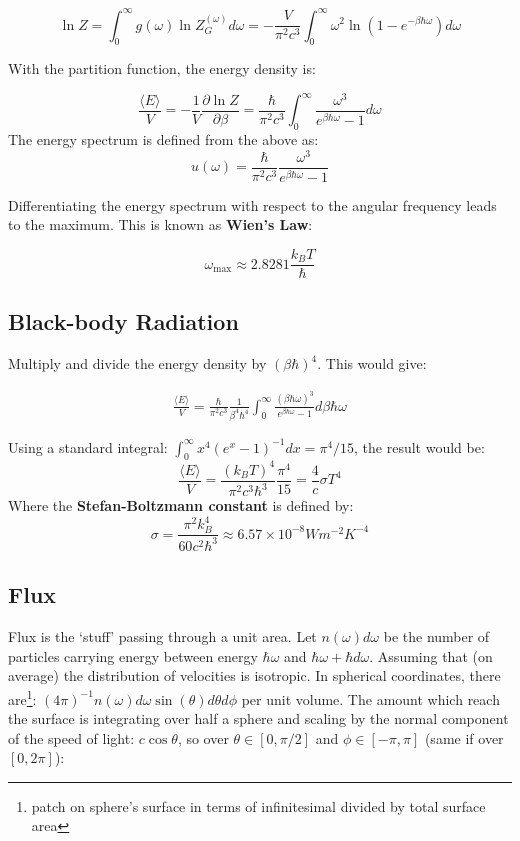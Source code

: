\documentclass[12pt]{article}
\begin{document}
\[\boxed{\ln Z = \int^\infty_0 g(\omega) \ln Z_G^{(\omega)} d\omega = -\frac{V}{\pi^2c^3}\int^\infty_0 \omega^2 \ln \left(1 - e^{-\beta \hbar \omega}\right) d\omega}\]

With the partition function, the energy density is:

\[\boxed{\frac{\langle E \rangle}{V} = -\frac{1}{V}\frac{\partial \ln Z}{\partial \beta}= \frac{\hbar}{\pi^2 c^3} \int^\infty_0 \frac{\omega^3}{e^{\beta\hbar\omega} - 1} d\omega}\]
The energy spectrum is defined from the above as:
\[\boxed{u(\omega) = \frac{\hbar}{\pi^2 c^3}  \frac{\omega^3}{e^{\beta\hbar\omega} - 1}}\]

Differentiating the energy spectrum with respect to the angular frequency leads to the maximum. This is known as \textbf{Wien's Law}:

\[\boxed{\omega_\text{max}\approx 2.8281\frac{k_BT}{\hbar}}\]

\subsection{Black-body Radiation}

Multiply and divide the energy density by $(\beta \hbar )^4$. This would give:

\begin{align*}
    \frac{\langle E\rangle}{V} = \frac{\hbar}{\pi^2 c^3}\frac{1}{\beta^4\hbar^4} \int^\infty_0 \frac{(\beta\hbar\omega)^3}{e^{\beta\hbar\omega} - 1} d\beta\hbar\omega
\end{align*}

Using a standard integral: $\int^\infty_0 x^4(e^x-1)^{-1}dx=\pi^4/15$, the result would be:
\[\boxed{ \frac{\langle E\rangle}{V}  = \frac{(k_B T)^4}{\pi^2 c^3\hbar^3}\frac{\pi^4}{15}=\frac{4}{c}\sigma T^4}\]
Where the \textbf{Stefan-Boltzmann constant} is defined by:
\[\boxed{\sigma = \frac{\pi^2k_B^4}{60c^2\hbar^3} \approx 6.57 \times 10^{-8} Wm^{-2}K^{-4}}\]

\subsection{Flux}
Flux is the `stuff' passing through a unit area. Let $n(\omega)d\omega$ be the number of particles carrying energy between energy $\hbar \omega$ and $\hbar\omega + \hbar d\omega$. Assuming that (on average) the distribution of velocities is isotropic. In spherical coordinates, there are\footnote{patch on sphere's surface in terms of infinitesimal divided by total surface area}: $(4\pi)^{-1}n(\omega)d\omega\sin(\theta)d\theta d\phi$ per unit volume. The amount which reach the surface is integrating over half a sphere and scaling by the normal component of the speed of light: $c\cos\theta$, so over $\theta \in [0,\pi/2]$ and $\phi \in [-\pi, \pi]$ (same if over $[0,2\pi]$):
\end{document}
